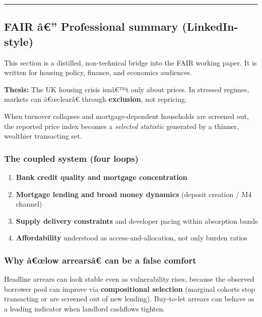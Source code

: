 \begin{center}\rule{0.5\linewidth}{0.5pt}\end{center}

\protect{}\label{fair-preface}
\subsection{FAIR â€'' Professional summary
(LinkedIn-style)}\label{fair-uxe2-professional-summary-linkedin-style}

This section is a distilled, non-technical bridge into the FAIR working
paper. It is written for housing policy, finance, and economics
audiences.

\textbf{Thesis:} The UK housing crisis isnâ€™t only about prices. In
stressed regimes, markets can â€œclearâ€ through \textbf{exclusion}, not
repricing.

When turnover collapses and mortgage-dependent households are screened
out, the reported price index becomes a \emph{selected statistic}
generated by a thinner, wealthier transacting set.

\subsubsection{The coupled system (four
loops)}\label{the-coupled-system-four-loops}

\begin{enumerate}
\def\labelenumi{\arabic{enumi}.}
\tightlist
\item
  \textbf{Bank credit quality and mortgage concentration}
\item
  \textbf{Mortgage lending and broad money dynamics} (deposit creation /
  M4 channel)
\item
  \textbf{Supply delivery constraints} and developer pacing within
  absorption bands
\item
  \textbf{Affordability} understood as access-and-allocation, not only
  burden ratios
\end{enumerate}

\subsubsection{Why â€œlow arrearsâ€ can be a false
comfort}\label{why-uxe2ux153low-arrearsuxe2-can-be-a-false-comfort}

Headline arrears can look stable even as vulnerability rises, because
the observed borrower pool can improve via \textbf{compositional
selection} (marginal cohorts stop transacting or are screened out of new
lending). Buy-to-let arrears can behave as a leading indicator when
landlord cashflows tighten.

